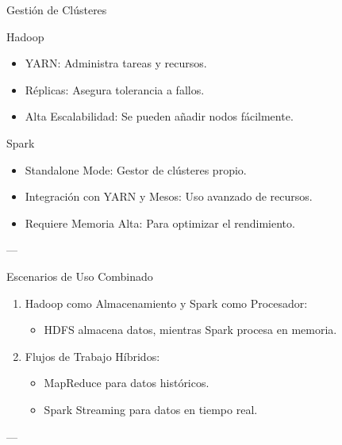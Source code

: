 \documentclass[presentation]{beamer}
\begin{document}
\begin{frame}[label={sec:orgee3dfcb}]{Gestión de Clústeres}
\begin{block}{Hadoop}
\begin{itemize}
\item \alert{\alert{YARN:}} Administra tareas y recursos.
\item \alert{\alert{Réplicas:}} Asegura tolerancia a fallos.
\item \alert{\alert{Alta Escalabilidad:}} Se pueden añadir nodos fácilmente.
\end{itemize}
\end{block}

\begin{block}{Spark}
\begin{itemize}
\item \alert{\alert{Standalone Mode:}} Gestor de clústeres propio.
\item \alert{\alert{Integración con YARN y Mesos:}} Uso avanzado de recursos.
\item \alert{\alert{Requiere Memoria Alta:}} Para optimizar el rendimiento.
\end{itemize}

---
\end{block}
\end{frame}

\begin{frame}[label={sec:org1cdbac6}]{Escenarios de Uso Combinado}
\begin{enumerate}
\item \alert{\alert{Hadoop como Almacenamiento y Spark como Procesador:}}
\begin{itemize}
\item HDFS almacena datos, mientras Spark procesa en memoria.
\end{itemize}
\item \alert{\alert{Flujos de Trabajo Híbridos:}}
\begin{itemize}
\item MapReduce para datos históricos.
\item Spark Streaming para datos en tiempo real.
\end{itemize}
\end{enumerate}

---
\end{frame}
\end{document}
